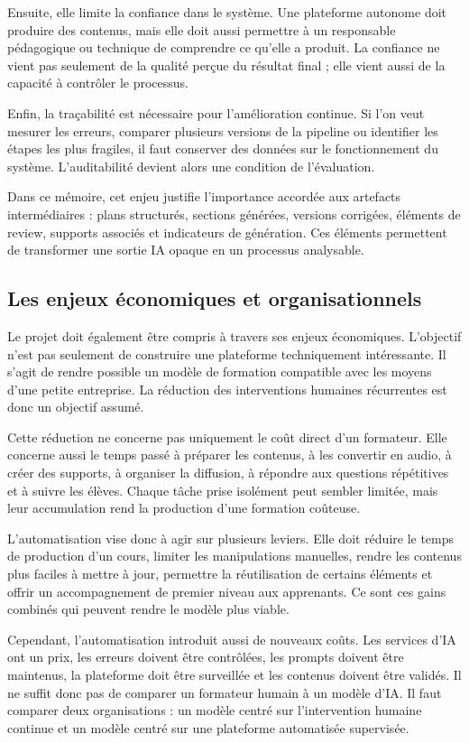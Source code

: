 Ensuite, elle limite la confiance dans le système. Une plateforme autonome doit produire
des contenus, mais elle doit aussi permettre à un responsable pédagogique ou technique
de comprendre ce qu'elle a produit. La confiance ne vient pas seulement de la qualité
perçue du résultat final ; elle vient aussi de la capacité à contrôler le processus.

Enfin, la traçabilité est nécessaire pour l'amélioration continue. Si l'on veut mesurer les
erreurs, comparer plusieurs versions de la pipeline ou identifier les étapes les plus
fragiles, il faut conserver des données sur le fonctionnement du système. L'auditabilité
devient alors une condition de l'évaluation.

Dans ce mémoire, cet enjeu justifie l'importance accordée aux artefacts intermédiaires :
plans structurés, sections générées, versions corrigées, éléments de review, supports
associés et indicateurs de génération. Ces éléments permettent de transformer une sortie
IA opaque en un processus analysable.

\subsection{Les enjeux économiques et organisationnels}

Le projet doit également être compris à travers ses enjeux économiques. L'objectif n'est
pas seulement de construire une plateforme techniquement intéressante. Il s'agit de rendre
possible un modèle de formation compatible avec les moyens d'une petite entreprise. La
réduction des interventions humaines récurrentes est donc un objectif assumé.

Cette réduction ne concerne pas uniquement le coût direct d'un formateur. Elle concerne
aussi le temps passé à préparer les contenus, à les convertir en audio, à créer des supports,
à organiser la diffusion, à répondre aux questions répétitives et à suivre les élèves. Chaque
tâche prise isolément peut sembler limitée, mais leur accumulation rend la production
d'une formation coûteuse.

L'automatisation vise donc à agir sur plusieurs leviers. Elle doit réduire le temps de
production d'un cours, limiter les manipulations manuelles, rendre les contenus plus
faciles à mettre à jour, permettre la réutilisation de certains éléments et offrir un
accompagnement de premier niveau aux apprenants. Ce sont ces gains combinés qui
peuvent rendre le modèle plus viable.

Cependant, l'automatisation introduit aussi de nouveaux coûts. Les services d'IA ont un
prix, les erreurs doivent être contrôlées, les prompts doivent être maintenus, la plateforme
doit être surveillée et les contenus doivent être validés. Il ne suffit donc pas de comparer
un formateur humain à un modèle d'IA. Il faut comparer deux organisations : un modèle
centré sur l'intervention humaine continue et un modèle centré sur une plateforme
automatisée supervisée.

